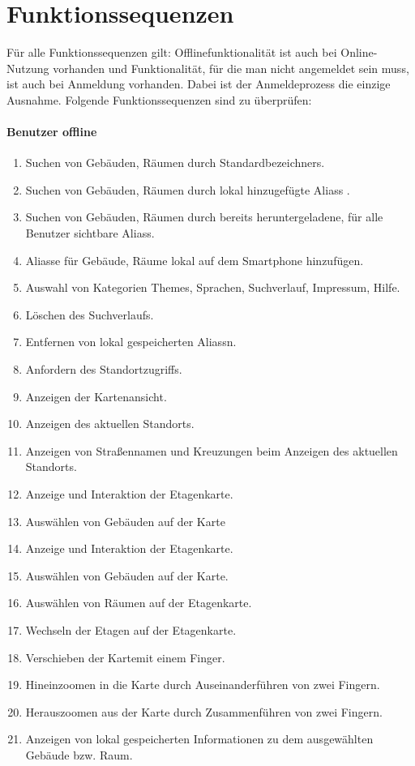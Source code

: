 \section{Funktionssequenzen}

Für alle Funktionssequenzen gilt:
Offlinefunktionalität ist auch bei Online-Nutzung vorhanden und Funktionalität, für die man nicht angemeldet sein muss, ist auch bei Anmeldung vorhanden. Dabei ist der Anmeldeprozess die einzige Ausnahme.
Folgende Funktionssequenzen sind zu überprüfen:

\paragraph{\Gls{Benutzer} offline}
\begin{enumerate}[label=\textbf{/T\arabic*0/}, align=left]
	\item Suchen von Gebäuden, Räumen durch \Glspl{Standardbezeichner}.
	\item Suchen von Gebäuden, Räumen durch lokal hinzugefügte \Glspl{Alias} .
	\item Suchen von Gebäuden, Räumen durch bereits heruntergeladene, für alle Benutzer sichtbare \Glspl{Alias}.
	\item Aliasse für Gebäude, Räume lokal auf dem Smartphone hinzufügen.
	\item Auswahl von Kategorien Themes, Sprachen, Suchverlauf, Impressum, Hilfe.
	\item Löschen des Suchverlaufs.
	\item Entfernen von lokal gespeicherten \Glspl{Alias}n.
	\item Anfordern des Standortzugriffs.
	\item Anzeigen der \Gls{Kartenansicht}.
	\item Anzeigen des aktuellen Standorts.
	\item Anzeigen von Straßennamen und Kreuzungen beim Anzeigen des aktuellen Standorts.
	\item Anzeige und Interaktion der \Gls{Etagenkarte}.
	\item Auswählen von Gebäuden auf der \Gls{Karte}
	\item Anzeige und Interaktion der \Gls{Etagenkarte}.
	\item Auswählen von Gebäuden auf der \Gls{Karte}.
	\item Auswählen von Räumen auf der \Gls{Etagenkarte}.
	\item Wechseln der Etagen auf der \Gls{Etagenkarte}.
	\item Verschieben der \Gls{Karte}mit einem Finger.
	\item Hineinzoomen in die \Gls{Karte} durch Auseinanderführen von zwei Fingern.
	\item Herauszoomen aus der \Gls{Karte} durch Zusammenführen von zwei Fingern.
	\item Anzeigen von lokal gespeicherten Informationen zu dem ausgewählten Gebäude bzw. Raum.
\end{enumerate}

